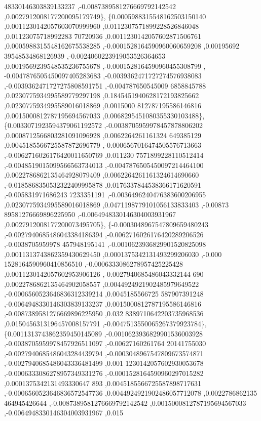 \begin{DoxyCode}
      48330146303839133237 ,-0.0087389581276669792142542 ,0.0027912008177200095179749\},
\{0.0005988315548162503150140 ,0.0011230142057603070999960 ,0.0112307571899228526846048 ,0.01123075718992283
      70720936 ,0.0011230142057602871506761 ,0.0005988315548162675538285 ,-0.0001528164590960060659208 ,0.00195692
      39548534868126939 ,-0.0024060223919053526364653 ,0.0019569239548535236755678 ,-0.0001528164590960455308799 ,
      -0.0047876505450097405283683 ,-0.0039362471727274576938083 ,-0.0039362471727275808591751 ,-0.004787650545009
      6858845788 ,0.0230775934995589779297198 ,0.1845451940628172193825662 ,0.0230775934995589016018869 ,0.0015000
      812787195586146816 ,0.0015000812787195694567033 ,0.0068295451080355330103488\},
\{0.0033071923594379061192572 ,-0.0038705959978457878806202 ,0.0008712566803281091096928 ,0.0062264261161324
      649385129 ,0.0045185566725587872696779 ,-0.0006567016474505576713663 ,-0.0062716026176420011650769 ,0.011230
      7571899228110512414 ,-0.0048519015099566563734013 ,-0.0047876505450097214464100 ,0.0022786862135464928079409
       ,0.0062264261161324614690660 ,-0.0185868350532322409995878 ,0.0176337844538366171620591 ,-0.005831971686243
      7233351191 ,-0.0036496240476383600206955 ,0.0230775934995589016018869 ,0.0471198779101056133833403 ,-0.00873
      89581276669896225950 ,-0.0064948330146304003931967 ,0.0027912008177200073495705\},
\{-0.0003048967547809659480243 ,-0.0027940685486043384186394 ,-0.0062716026176420289206526 ,-0.0038705959978
      457948195141 ,-0.0010623936829901520825098 ,0.0011313743862359430629450 ,0.0001375342131493299206030 ,-0.000
      1528164590960410856510 ,-0.0006333086278957425225428 ,0.0011230142057602953906126 ,-0.0027940685486043332144
      690 ,0.0022786862135464902058557 ,0.0044924921902485979649522 ,-0.0006560523646836312339214 ,0.0045185566725
      587907391248 ,-0.0064948330146303839133237 ,0.0015000812787195586146816 ,-0.0087389581276669896225950 ,0.032
      8389710642203735968536 ,0.0150456313196457008157791 ,-0.0047513550065267379923784\},
\{0.0011313743862359450145089 ,-0.0010623936829901536003928 ,-0.0038705959978457926511097 ,-0.00627160261764
      20141755030 ,-0.0027940685486043284439794 ,-0.0003048967547809673574871 ,-0.0027940685486043336481499 ,0.001
      1230142057602930053678 ,-0.0006333086278957349331276 ,-0.0001528164590960297015282 ,0.0001375342131493330647
      893 ,0.0045185566725587898717631 ,-0.0006560523646836572547736 ,0.0044924921902486057712078 ,0.0022786862135
      464945426644 ,-0.0087389581276669792142542 ,0.0015000812787195694567033 ,-0.0064948330146304003931967 ,0.015

\end{DoxyCode}
